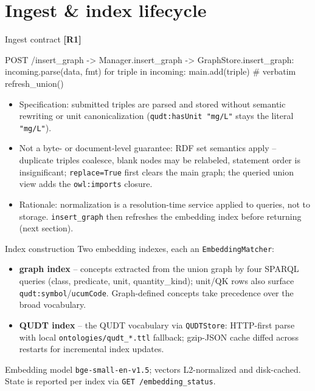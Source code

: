\documentclass[aspectratio=169]{beamer}
\newcommand{\code}[1]{\texttt{\small #1}}
\newcommand{\req}[1]{\textbf{[#1]}}
\begin{document}
\section{Ingest \& index lifecycle}

\begin{frame}[fragile]{Ingest contract \req{R1}}
  \begin{semiverbatim}\scriptsize
POST /insert_graph -> Manager.insert_graph -> GraphStore.insert_graph:
    incoming.parse(data, fmt)
    for triple in incoming: main.add(triple)     # verbatim
    refresh_union()
  \end{semiverbatim}
  \begin{itemize}
    \item Specification: submitted triples are parsed and stored without
          semantic rewriting or unit canonicalization
          (\code{qudt:hasUnit "mg/L"} stays the literal \code{"mg/L"}).
    \item Not a byte- or document-level guarantee: RDF set semantics
          apply -- duplicate triples coalesce, blank nodes may be
          relabeled, statement order is insignificant; \code{replace=True}
          first clears the main graph; the queried union view adds the
          \code{owl:imports} closure.
    \item Rationale: normalization is a resolution-time service applied to
          queries, not to storage. \code{insert\_graph} then refreshes the
          embedding index before returning (next section).
  \end{itemize}
\end{frame}

\begin{frame}{Index construction}
  Two embedding indexes, each an \code{EmbeddingMatcher}:
  \begin{itemize}
    \item \textbf{graph index} -- concepts extracted from the union graph
          by four SPARQL queries (class, predicate, unit, quantity\_kind);
          unit/QK rows also surface \code{qudt:symbol}/\code{ucumCode}.
          Graph-defined concepts take precedence over the broad vocabulary.
    \item \textbf{QUDT index} -- the QUDT vocabulary via \code{QUDTStore}:
          HTTP-first parse with local \code{ontologies/qudt\_*.ttl}
          fallback; gzip-JSON cache diffed across restarts for incremental
          index updates.
  \end{itemize}
  Embedding model \code{bge-small-en-v1.5}; vectors L2-normalized and
  disk-cached. State is reported per index via \code{GET /embedding\_status}.
\end{frame}
\end{document}
